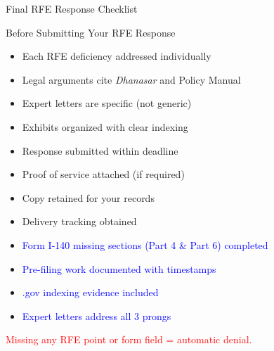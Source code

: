\documentclass[11pt]{beamer}
\begin{document}
	\begin{frame}{Final RFE Response Checklist}
		\scriptsize
		\begin{block}{Before Submitting Your RFE Response}
			\begin{itemize}
				\item [$\square$] Each RFE deficiency addressed individually
				\item [$\square$] Legal arguments cite \textit{Dhanasar} and Policy Manual
				\item [$\square$] Expert letters are specific (not generic)
				\item [$\square$] Exhibits organized with clear indexing
				\item [$\square$] Response submitted within deadline
				\item [$\square$] Proof of service attached (if required)
				\item [$\square$] Copy retained for your records
				\item [$\square$] Delivery tracking obtained
				\item [$\square$] \textcolor{blue}{Form I-140 missing sections (Part 4 \& Part 6) completed}
				\item [$\square$] \textcolor{blue}{Pre-filing work documented with timestamps}
				\item [$\square$] \textcolor{blue}{.gov indexing evidence included}
				\item [$\square$] \textcolor{blue}{Expert letters address all 3 prongs}
			\end{itemize}
			\textcolor{red}{Missing any RFE point or form field = automatic denial.}
		\end{block}
	\end{frame}
	
\end{document}
